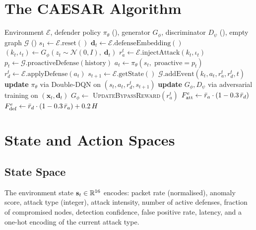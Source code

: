 \section{The CAESAR Algorithm}

\begin{algorithm}[htbp]
\caption{\caesar{} Co-evolutionary Training Loop}
\label{alg:caesar}
\begin{algorithmic}[1]
\Require Environment $\mathcal{E}$, defender policy $\pi_\theta$ (\adpn),
         generator $G_\phi$, discriminator $D_\psi$ (\tagan),
         empty graph $\mathcal{G}$ (\tagraph)
  \State $s_1 \leftarrow \mathcal{E}.\mathrm{reset}()$
    \State $\mathbf{d}_t \leftarrow \mathcal{E}.\mathrm{defenseEmbedding}()$
    \State $(k_t, \iota_t) \leftarrow G_\phi(z_t \sim \mathcal{N}(0,I),\; \mathbf{d}_t)$
    \State $r_a^t \leftarrow \mathcal{E}.\mathrm{injectAttack}(k_t, \iota_t)$
    \State $p_t \leftarrow \mathcal{G}.\mathrm{proactiveDefense}(\text{history})$
    \State $a_t \leftarrow \pi_\theta(s_t,\; \mathrm{proactive}{=}p_t)$
    \State $r_d^t \leftarrow \mathcal{E}.\mathrm{applyDefense}(a_t)$
    \State $s_{t+1} \leftarrow \mathcal{E}.\mathrm{getState}()$
    \State $\mathcal{G}.\mathrm{addEvent}(k_t, a_t, r_a^t, r_d^t, t)$
    \State \textbf{update} $\pi_\theta$ via Double-DQN on $(s_t,a_t,r_d^t,s_{t+1})$
    \State \textbf{update} $G_\phi, D_\psi$ via adversarial training on $(\mathbf{x}_t, \mathbf{d}_t)$
    \State $G_\phi \leftarrow$ \textsc{UpdateBypassReward}$(r_a^t)$
  \EndFor
  \State $F_{\mathrm{att}}^e \leftarrow \bar r_a \cdot (1 - 0.3\,\bar r_d)$
  \State $F_{\mathrm{def}}^e \leftarrow \bar r_d \cdot (1 - 0.3\,\bar r_a) + 0.2\,H$
\EndFor
\end{algorithmic}
\end{algorithm}

\section{State and Action Spaces}

\subsection{State Space}
The environment state $\mathbf{s}_t \in \mathbb{R}^{16}$ encodes:
packet rate (normalised), anomaly score, attack type (integer), attack
intensity, number of active defenses, fraction of compromised nodes,
detection confidence, false positive rate, latency, and a one-hot encoding
of the current attack type.

